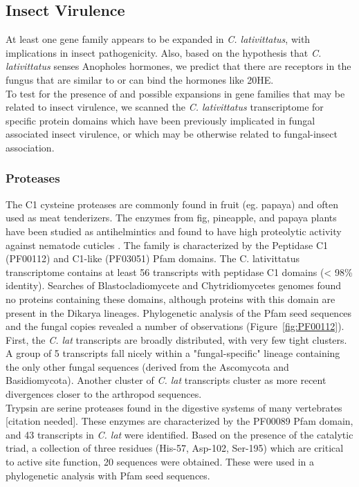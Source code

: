 \subsection*{Insect Virulence} 
At least one gene family appears to be expanded in \textit{C. lativittatus}, with implications in insect pathogenicity. Also, based on the hypothesis that \textit{C. lativittatus} senses Anopholes hormones, we predict that there are receptors in the fungus that are similar to or can bind the hormones like 20HE. \\
\indent To test for the presence of and possible expansions in gene families that may be related to insect virulence, we scanned the \textit{C. lativittatus} transcriptome for specific protein domains which have been previously implicated in fungal associated insect virulence, or which may be otherwise related to fungal-insect association. \\
\subsubsection*{Proteases} 
The C1 cysteine proteases are commonly found in fruit (eg. papaya) and often used as meat tenderizers. The enzymes from fig, pineapple, and papaya plants have been studied as antihelmintics and found to have high proteolytic activity against nematode cuticles \cite{Stepek2004}. The family is characterized by the Peptidase C1 (PF00112) and C1-like (PF03051) Pfam domains. The C. lativittatus transcriptome contains at least 56 transcripts with peptidase C1 domains (< 98\% identity). Searches of Blastocladiomycete and Chytridiomycetes genomes found no proteins containing these domains, although proteins with this domain are present in the Dikarya lineages. Phylogenetic analysis of the Pfam seed sequences and the fungal copies revealed a number of observations (Figure~\ref{fig:PF00112}). First, the \textit{C. lat} transcripts are broadly distributed, with very few tight clusters. A group of 5 transcripts fall nicely within a "fungal-specific" lineage containing the only other fungal sequences (derived from the Ascomycota and Basidiomycota). Another cluster of \textit{C. lat} transcripts cluster as more recent divergences closer to the arthropod sequences. \\
\indent Trypsin are serine proteases found in the digestive systems of many vertebrates [citation needed]. These enzymes are characterized by the PF00089 Pfam domain, and 43 transcripts in \textit{C. lat} were identified. Based on the presence of the catalytic triad, a collection of three residues (His-57, Asp-102, Ser-195) which are critical to active site function, 20 sequences were obtained. These were used in a phylogenetic analysis with Pfam seed sequences.\\
